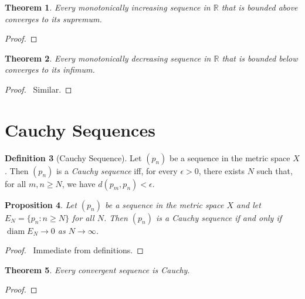 \documentclass{book}
\let\qed\relax
\newtheorem{prop}{Proposition}[chapter]
\newtheorem{thm}[prop]{Theorem}
\theoremstyle{definition}
\newtheorem{df}[prop]{Definition}
\newcommand{\diam}{\ensuremath{\operatorname{diam}}}
\begin{document}
\begin{thm}
Every monotonically increasing sequence in $\mathbb{R}$ that is bounded above converges to its supremum.
\end{thm}

\begin{proof}
\pf
{}
\qed
\end{proof}

\begin{thm}
Every monotonically decreasing sequence in $\mathbb{R}$ that is bounded below converges to its infimum.
\end{thm}

\begin{proof}
\pf\ Similar. \qed
\end{proof}

\section{Cauchy Sequences}

\begin{df}[Cauchy Sequence]
Let $(p_n)$ be a sequence in the metric space $X$. Then $(p_n)$ is a \emph{Cauchy sequence} iff, for every $\epsilon > 0$, there exists $N$ such that, for all $m,n \geq N$, we have $d(p_m,p_n) < \epsilon$.
\end{df}

\begin{prop}
Let $(p_n)$ be a sequence in the metric space $X$ and let $E_N = \{ p_n : n \geq N \}$ for all $N$. Then $(p_n)$ is a Cauchy sequence if and only if $\diam E_N \rightarrow 0$ as $N \rightarrow \infty$.
\end{prop}

\begin{proof}
\pf\ Immediate from definitions. \qed
\end{proof}

\begin{thm}
Every convergent sequence is Cauchy.
\end{thm}

\begin{proof}
\pf
{}
\qed
\end{proof}
\end{document}
